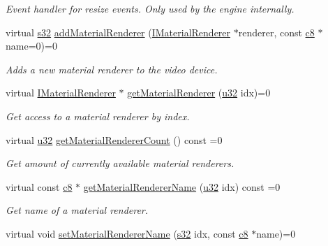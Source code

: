 \begin{DoxyCompactItemize}
\begin{DoxyCompactList}\small\item\em Event handler for resize events. Only used by the engine internally. \end{DoxyCompactList}\item 
virtual \hyperlink{namespaceirr_ac66849b7a6ed16e30ebede579f9b47c6}{s32} \hyperlink{classirr_1_1video_1_1IVideoDriver_a0dfc3a7168f3a73a6f4323b579f03ff6}{add\+Material\+Renderer} (\hyperlink{classirr_1_1video_1_1IMaterialRenderer}{I\+Material\+Renderer} $\ast$renderer, const \hyperlink{namespaceirr_a9395eaea339bcb546b319e9c96bf7410}{c8} $\ast$name=0)=0
\begin{DoxyCompactList}\small\item\em Adds a new material renderer to the video device. \end{DoxyCompactList}\item 
virtual \hyperlink{classirr_1_1video_1_1IMaterialRenderer}{I\+Material\+Renderer} $\ast$ \hyperlink{classirr_1_1video_1_1IVideoDriver_accb321dfb32ad3c76efb99427bc90cc8}{get\+Material\+Renderer} (\hyperlink{namespaceirr_a0416a53257075833e7002efd0a18e804}{u32} idx)=0
\begin{DoxyCompactList}\small\item\em Get access to a material renderer by index. \end{DoxyCompactList}\item 
virtual \hyperlink{namespaceirr_a0416a53257075833e7002efd0a18e804}{u32} \hyperlink{classirr_1_1video_1_1IVideoDriver_a928018242ff962a0d37bfdab2019bea0}{get\+Material\+Renderer\+Count} () const  =0
\begin{DoxyCompactList}\small\item\em Get amount of currently available material renderers. \end{DoxyCompactList}\item 
virtual const \hyperlink{namespaceirr_a9395eaea339bcb546b319e9c96bf7410}{c8} $\ast$ \hyperlink{classirr_1_1video_1_1IVideoDriver_ac5d9a63968887470b663f17b574a1642}{get\+Material\+Renderer\+Name} (\hyperlink{namespaceirr_a0416a53257075833e7002efd0a18e804}{u32} idx) const  =0
\begin{DoxyCompactList}\small\item\em Get name of a material renderer. \end{DoxyCompactList}\item 
virtual void \hyperlink{classirr_1_1video_1_1IVideoDriver_a4ef324ed93094f84832e8d31cf0776f2}{set\+Material\+Renderer\+Name} (\hyperlink{namespaceirr_ac66849b7a6ed16e30ebede579f9b47c6}{s32} idx, const \hyperlink{namespaceirr_a9395eaea339bcb546b319e9c96bf7410}{c8} $\ast$name)=0

\end{DoxyCompactItemize}
